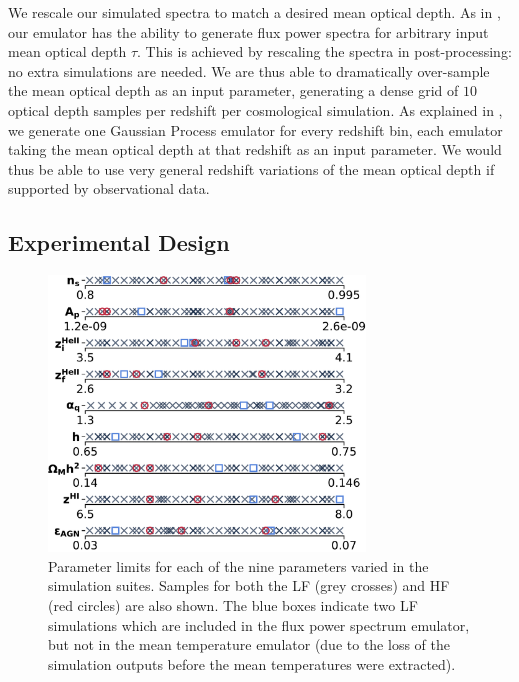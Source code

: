\documentclass[a4paper,11pt]{article}
\begin{document}
We rescale our simulated spectra to match a desired mean optical depth. As in \cite{Bird:2019}, our emulator has the ability to generate flux power spectra for arbitrary input mean optical depth $\tau$. This is achieved by rescaling the spectra in post-processing: no extra simulations are needed. We are thus able to dramatically over-sample the mean optical depth as an input parameter, generating a dense grid of $10$ optical depth samples per redshift per cosmological simulation. As explained in \cite{Bird:2019}, we generate one Gaussian Process emulator for every redshift bin, each emulator taking the mean optical depth at that redshift as an input parameter. We would thus be able to use very general redshift variations of the mean optical depth if supported by observational data.



\subsection{Experimental Design}
\label{sec:latinhypercube}

\begin{figure}
    \centering
    \includegraphics[width=0.75\textwidth]{figures/sample_params.pdf}
    \caption{\label{fig:samples}
    Parameter limits for each of the nine parameters varied in the simulation suites.
    Samples for both the LF (grey crosses) and HF (red circles) are also shown.
    The blue boxes indicate two LF simulations which are included in the flux power spectrum emulator, but not in the mean temperature emulator (due to the loss of the simulation outputs before the mean temperatures were extracted).
    }
\end{figure}
\end{document}
